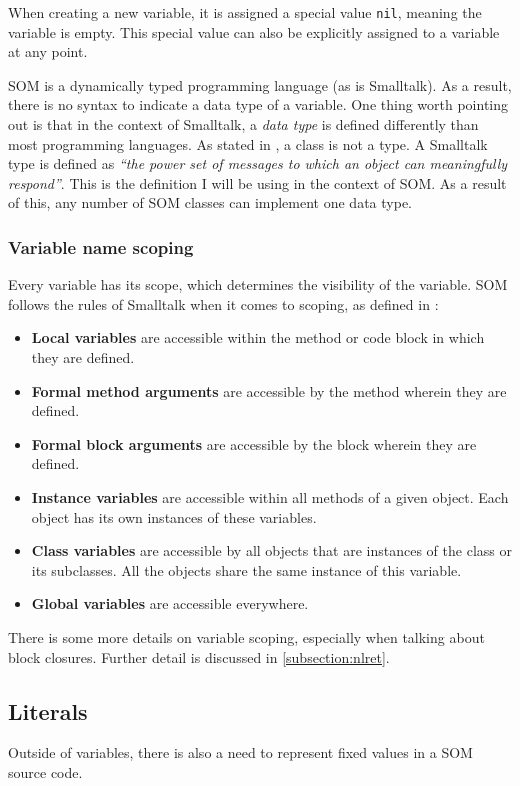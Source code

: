 \documentclass[thesis=M,english]{FITthesis}[2019/12/23]
\begin{document}
When creating a new variable, it is assigned a special value \texttt{nil}, meaning the variable is empty. This
special value can also be explicitly assigned to a variable at any point.

SOM is a dynamically typed programming language (as is Smalltalk). As a result, there is no syntax to indicate
a data type of a variable. One thing worth pointing out is that in the context of Smalltalk, a \textit{data type}
is defined differently than most programming languages. As stated in \cite{smalltalk-essentials}, a class is not
a type. A Smalltalk type is defined as \textit{``the power set of messages to which an object can meaningfully
respond''}\cite{smalltalk-essentials}. This is the definition I will be using in the context of SOM. As a result
of this, any number of SOM classes can implement one data type.

\subsubsection{Variable name scoping}
Every variable has its scope, which determines the visibility of the variable. SOM follows the rules of Smalltalk
when it comes to scoping, as defined in \cite{smalltalk-essentials}:

\begin{itemize}
	\item \textbf{Local variables} are accessible within the method or code block in which they are defined.
	\item \textbf{Formal method arguments} are accessible by the method wherein they are defined.
	\item \textbf{Formal block arguments} are accessible by the block wherein they are defined.
	\item \textbf{Instance variables} are accessible within all methods of a given object. Each object
		has its own instances of these variables.
	\item \textbf{Class variables} are accessible by all objects that are instances of the class or its
		subclasses. All the objects share the same instance of this variable.
	\item \textbf{Global variables} are accessible everywhere.
\end{itemize}

There is some more details on variable scoping, especially when talking about block closures. Further detail
is discussed in \ref{subsection:nlret}.

\subsection{Literals}
Outside of variables, there is also a need to represent fixed values in a SOM source code. 
\end{document}
